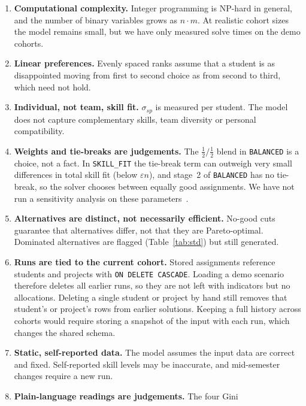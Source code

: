 \documentclass[11pt,a4paper]{article}
\newcommand{\code}[1]{\texttt{#1}}
\begin{document}
\begin{enumerate}
  \item \textbf{Computational complexity.} Integer programming is NP-hard in
        general, and the number of binary variables grows as $n \cdot m$. At
        realistic cohort sizes the model remains small, but we have only
        measured solve times on the demo cohorts.
  \item \textbf{Linear preferences.} Evenly spaced ranks assume that a
        student is as disappointed moving from first to second choice as
        from second to third, which need not hold.
  \item \textbf{Individual, not team, skill fit.} $\sigma_{sp}$ is measured
        per student. The model does not capture complementary skills, team
        diversity or personal compatibility.
  \item \textbf{Weights and tie-breaks are judgements.} The $\tfrac12/\tfrac12$
        blend in \code{BALANCED} is a choice, not a fact. In
        \code{SKILL\_FIT} the tie-break term can outweigh very small
        differences in total skill fit (below $\varepsilon n$), and stage~2 of
        \code{BALANCED} has no tie-break, so the solver chooses between
        equally good assignments. We have not run a sensitivity analysis on
        these parameters~\cite[Ch.~7]{ior}.
  \item \textbf{Alternatives are distinct, not necessarily efficient.} No-good
        cuts guarantee that alternatives differ, not that they are
        Pareto-optimal. Dominated alternatives are flagged
        (Table~\ref{tab:std}) but still generated.
  \item \textbf{Runs are tied to the current cohort.} Stored assignments
        reference students and projects with \code{ON DELETE CASCADE}.
        Loading a demo scenario therefore deletes all earlier runs, so they
        are not left with indicators but no allocations. Deleting a single
        student or project by hand still removes that student's or
        project's rows from earlier solutions. Keeping a full history across
        cohorts would require storing a snapshot of the input with each run,
        which changes the shared schema.
  \item \textbf{Static, self-reported data.} The model assumes the input data
        are correct and fixed. Self-reported skill levels may be inaccurate,
        and mid-semester changes require a new run.
  \item \textbf{Plain-language readings are judgements.} The four Gini

\end{enumerate}
\end{document}
